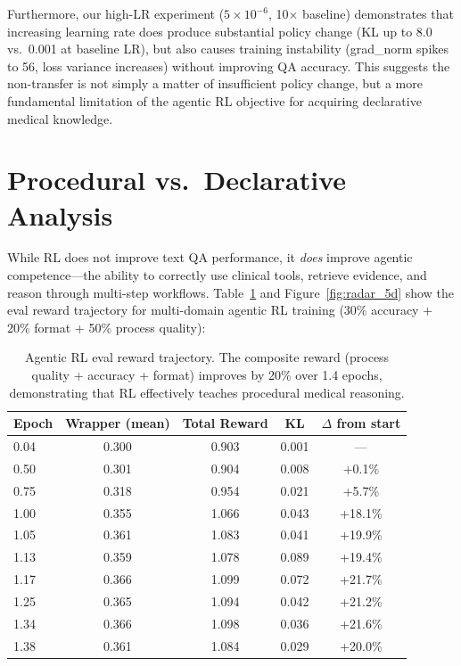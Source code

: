 \documentclass{article}
\begin{document}
Furthermore, our high-LR experiment ($5 \times 10^{-6}$, 10$\times$ baseline) demonstrates that increasing learning rate does produce substantial policy change (KL up to 8.0 vs.\ 0.001 at baseline LR), but also causes training instability (grad\_norm spikes to 56, loss variance increases) without improving QA accuracy. This suggests the non-transfer is not simply a matter of insufficient policy change, but a more fundamental limitation of the agentic RL objective for acquiring declarative medical knowledge.


\section{Procedural vs.\ Declarative Analysis}
\label{app:procedural}

While RL does not improve text QA performance, it \emph{does} improve agentic competence---the ability to correctly use clinical tools, retrieve evidence, and reason through multi-step workflows. Table~\ref{tab:agentic_reward} and Figure~\ref{fig:radar_5d} show the eval reward trajectory for multi-domain agentic RL training (30\% accuracy + 20\% format + 50\% process quality):

\begin{table}[h]
\centering
\caption{Agentic RL eval reward trajectory. The composite reward (process quality + accuracy + format) improves by 20\% over 1.4 epochs, demonstrating that RL effectively teaches procedural medical reasoning.}
\label{tab:agentic_reward}
\begin{tabular}{lcccc}
\toprule
\textbf{Epoch} & \textbf{Wrapper (mean)} & \textbf{Total Reward} & \textbf{KL} & \textbf{$\Delta$ from start} \\
\midrule
0.04 & 0.300 & 0.903 & 0.001 & --- \\
0.50 & 0.301 & 0.904 & 0.008 & +0.1\% \\
0.75 & 0.318 & 0.954 & 0.021 & +5.7\% \\
1.00 & 0.355 & 1.066 & 0.043 & +18.1\% \\
1.05 & 0.361 & 1.083 & 0.041 & +19.9\% \\
1.13 & 0.359 & 1.078 & 0.089 & +19.4\% \\
1.17 & 0.366 & 1.099 & 0.072 & +21.7\% \\
1.25 & 0.365 & 1.094 & 0.042 & +21.2\% \\
1.34 & 0.366 & 1.098 & 0.036 & +21.6\% \\
1.38 & 0.361 & 1.084 & 0.029 & +20.0\% \\
\bottomrule
\end{tabular}
\end{table}
\end{document}
